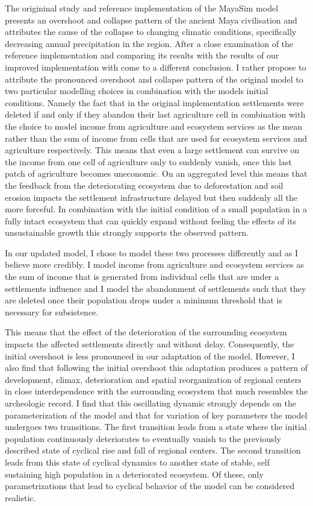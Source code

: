 The origininal study \citep{Heckbert2013} and reference implementation \citep{Heckbert2013model} of the MayaSim model presents an overshoot and collapse pattern of the ancient Maya civilisation and attributes the cause of the collapse to changing climatic conditions, specifically decreasing annual precipitation in the region. After a close examination of the reference implementation and comparing its results with the results of our improved implementation with come to a different conclusion. I rather propose to attribute the pronounced overshoot and collapse pattern of the original model to two particular modelling choices in combination with the models initial conditions. Namely the fact that in the original implementation settlements were deleted if and only if they abandon their last agriculture cell in combination with the choice to model income from agriculture and ecosystem services as the mean rather than the sum of income from cells that are used for ecosystem services and agriculture respectively. This means that even a large settlement can survive on the income from one cell of agriculture only to suddenly vanish, once this last patch of agriculture becomes uneconomic. On an aggregated level this means that the feedback from the deteriorating ecosystem due to deforestation and soil erosion impacts the settlement infrastructure delayed but then suddenly all the more forceful. In combination with the initial condition of a small population in a fully intact ecosystem that can quickly expand without feeling the effects of its unsustainable growth this strongly supports the observed pattern.

In our updated model, I chose to model these two processes differently and as I believe more credibly. I model income from agriculture and ecosystem services as the sum of income that is generated from individual cells that are under a settlements influence and I model the abandonment of settlements such that they are deleted once their population drops under a minimum threshold that is necessary for subsistence.

This means that the effect of the deterioration of the surrounding ecosystem impacts the affected settlements directly and without delay. Consequently, the initial overshoot is less pronounced in our adaptation of the model. However, I also find that following the initial overshoot this adaptation produces a pattern of development, climax, deterioration and spatial reorganization of regional centers in close interdependence with the surrounding ecosystem that much resembles the archeologic record. I find that this oscillating dynamic strongly depends on the parameterization of the model and that for variation of key parameters the model undergoes two transitions. The first transition leads from a state where the initial population continuously deteriorates to eventually vanish to the previously described state of cyclical rise and fall of regional centers. The second transition leads from this state of cyclical dynamics to another state of stable, self sustaining high population in a deteriorated ecosystem. Of these, only parametrizations that lead to cyclical behavior of the model can be considered realistic.

